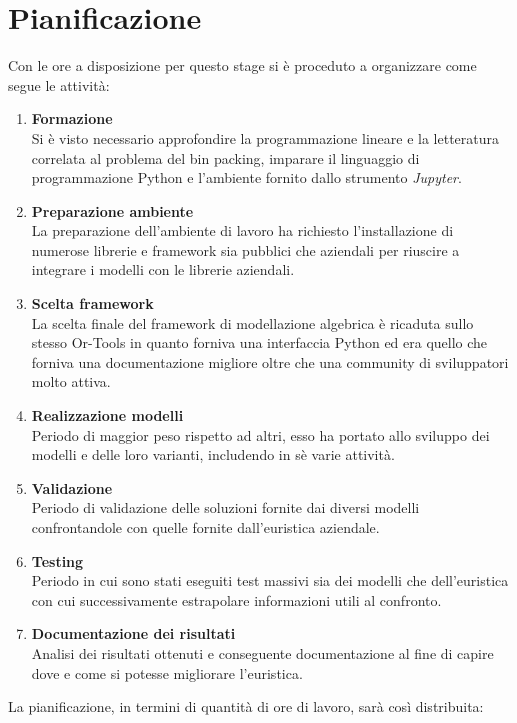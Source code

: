 \section{Pianificazione}
Con le ore a disposizione per questo stage si è proceduto a organizzare come segue le attività:
\begin{enumerate}
	\item \textbf{Formazione}\\
	Si è visto necessario approfondire la programmazione lineare e la letteratura correlata al problema del bin packing, imparare il linguaggio di programmazione Python e l'ambiente fornito dallo strumento \textit{Jupyter}.
	\item \textbf{Preparazione ambiente}\\ 
	La preparazione dell'ambiente di lavoro ha richiesto l'installazione di numerose librerie e framework sia pubblici che aziendali per riuscire a integrare i modelli con le librerie aziendali.
	\item \textbf{Scelta framework}\\
	La scelta finale del framework di modellazione algebrica è ricaduta sullo stesso Or-Tools in quanto forniva una interfaccia Python ed era quello che forniva una documentazione migliore oltre che una community di sviluppatori molto attiva.
	\item \textbf{Realizzazione modelli}\\
	Periodo di maggior peso rispetto ad altri, esso ha portato allo sviluppo dei modelli e delle loro varianti, includendo in sè varie attività.
	\item \textbf{Validazione}\\
	Periodo di validazione delle soluzioni fornite dai diversi modelli confrontandole con quelle fornite dall'euristica aziendale.
	\item \textbf{Testing}\\
	Periodo in cui sono stati eseguiti test massivi sia dei modelli che dell'euristica con cui successivamente estrapolare informazioni utili al confronto.
	\item \textbf{Documentazione dei risultati}\\
	Analisi dei risultati ottenuti e conseguente documentazione al fine di capire dove e come si potesse migliorare l'euristica.
\end{enumerate}
La pianificazione, in termini di quantità di ore di lavoro, sarà così distribuita:
